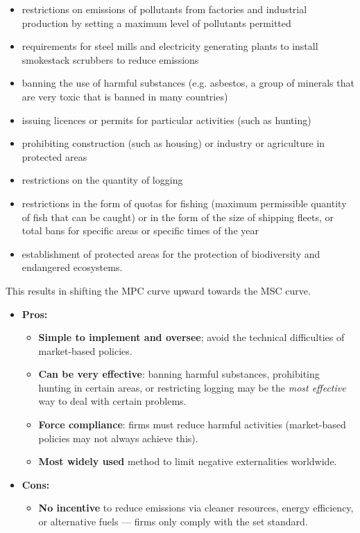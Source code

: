 \documentclass[a4paper,12pt]{article}
\begin{document}
\begin{itemize}
  \begin{itemize}
    \item restrictions on emissions of pollutants from
factories and industrial production by setting a maximum level of pollutants permitted
\item requirements for steel mills and electricity
generating plants to install smokestack scrubbers to reduce emissions
\item banning the use of harmful substances (e.g.
asbestos, a group of minerals that are very toxic that is banned in many countries)
\item issuing licences or permits for particular activities (such as hunting)
\item prohibiting construction (such as housing) or industry or agriculture in protected areas
\item restrictions on the quantity of logging
\item restrictions in the form of quotas for fishing (maximum permissible quantity of fish that can be caught) or in the form of the size of shipping fleets, or total bans for specific areas or specific times of the year
\item establishment of protected areas for the protection of biodiversity and endangered ecosystems.
  \end{itemize}
  This results in shifting the MPC curve upward towards the MSC curve.
  \begin{itemize}
    \item \textbf{Pros:}
    \begin{itemize}
      \item \textbf{Simple to implement and oversee}; avoid the technical difficulties of market-based policies.
      \item \textbf{Can be very effective}: banning harmful substances, prohibiting hunting in certain areas, or restricting logging may be the \textit{most effective} way to deal with certain problems.
      \item \textbf{Force compliance}: firms must reduce harmful activities (market-based policies may not always achieve this).
      \item \textbf{Most widely used} method to limit negative externalities worldwide.
    \end{itemize}
    \item \textbf{Cons:}
    \begin{itemize}
      \item \textbf{No incentive} to reduce emissions via cleaner resources, energy efficiency, or alternative fuels --- firms only comply with the set standard.

\end{itemize}
\end{itemize}
\end{itemize}
\end{document}
